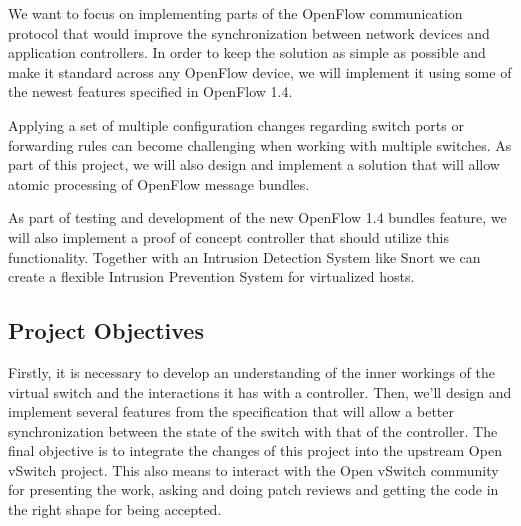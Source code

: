 We want to focus on implementing parts of the OpenFlow communication protocol that would improve
the synchronization between network devices and application controllers. In order to keep the solution
as simple as possible and make it standard across any OpenFlow device, we will implement it using
some of the newest features specified in OpenFlow 1.4.

Applying a set of multiple configuration changes regarding switch ports or forwarding rules can become
challenging when working with multiple switches. As part of this project, we will also design and implement
a solution that will allow atomic processing of OpenFlow message bundles.

As part of testing and development of the new OpenFlow 1.4 bundles feature, we will also implement a proof of concept
controller that should utilize this functionality. Together with an Intrusion Detection System like Snort\cite{snort}
we can create a flexible Intrusion Prevention System for virtualized hosts.


\subsection{Project Objectives}
\label{sub-sec:proj-objectives}

Firstly, it is necessary to develop an understanding of the inner workings of the virtual switch and the interactions
it has with a controller. Then, we'll design and implement several features from the specification that will
allow a better synchronization between the state of the switch with that of the controller. The final objective
is to integrate the changes of this project into the upstream Open vSwitch project. This also means to interact
with the Open vSwitch community for presenting the work, asking and doing patch reviews and getting the code in
the right shape for being accepted.



